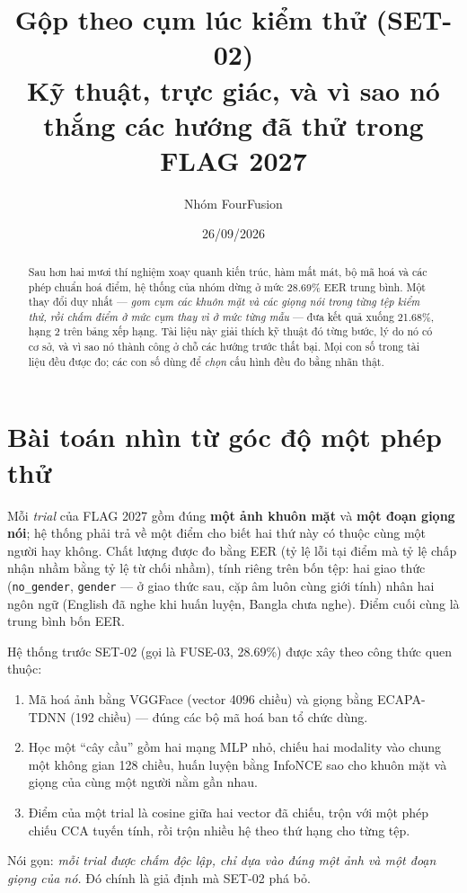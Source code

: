 \documentclass[11pt,a4paper]{article}
\title{\textbf{Gộp theo cụm lúc kiểm thử (SET-02)}\\[4pt]
\large Kỹ thuật, trực giác, và vì sao nó thắng các hướng đã thử trong FLAG 2027}
\author{Nhóm FourFusion}
\date{26/09/2026}
\newcommand{\key}[1]{\textbf{\color{accent}#1}}
\begin{document}
\maketitle

\begin{abstract}
\noindent Sau hơn hai mươi thí nghiệm xoay quanh kiến trúc, hàm mất mát, bộ mã hoá và các phép chuẩn hoá điểm, hệ thống của nhóm dừng ở mức 28.69\% EER trung bình. Một thay đổi duy nhất --- \emph{gom cụm các khuôn mặt và các giọng nói trong từng tệp kiểm thử, rồi chấm điểm ở mức cụm thay vì ở mức từng mẫu} --- đưa kết quả xuống 21.68\%, hạng 2 trên bảng xếp hạng. Tài liệu này giải thích kỹ thuật đó từng bước, lý do nó có cơ sở, và vì sao nó thành công ở chỗ các hướng trước thất bại. Mọi con số trong tài liệu đều được đo; các con số dùng để \emph{chọn} cấu hình đều đo bằng nhãn thật.
\end{abstract}

\section{Bài toán nhìn từ góc độ một phép thử}

Mỗi \emph{trial} của FLAG 2027 gồm đúng \key{một ảnh khuôn mặt} và \key{một đoạn giọng nói}; hệ thống phải trả về một điểm cho biết hai thứ này có thuộc cùng một người hay không. Chất lượng được đo bằng EER (tỷ lệ lỗi tại điểm mà tỷ lệ chấp nhận nhầm bằng tỷ lệ từ chối nhầm), tính riêng trên bốn tệp: hai giao thức (\texttt{no\_gender}, \texttt{gender} --- ở giao thức sau, cặp âm luôn cùng giới tính) nhân hai ngôn ngữ (English đã nghe khi huấn luyện, Bangla chưa nghe). Điểm cuối cùng là trung bình bốn EER.

Hệ thống trước SET-02 (gọi là FUSE-03, 28.69\%) được xây theo công thức quen thuộc:
\begin{enumerate}[leftmargin=1.5em,itemsep=2pt]
\item Mã hoá ảnh bằng VGGFace (vector 4096 chiều) và giọng bằng ECAPA-TDNN (192 chiều) --- đúng các bộ mã hoá ban tổ chức dùng.
\item Học một ``cây cầu'' gồm hai mạng MLP nhỏ, chiếu hai modality vào chung một không gian 128 chiều, huấn luyện bằng InfoNCE sao cho khuôn mặt và giọng của cùng một người nằm gần nhau.
\item Điểm của một trial là cosine giữa hai vector đã chiếu, trộn với một phép chiếu CCA tuyến tính, rồi trộn nhiều hệ theo thứ hạng cho từng tệp.
\end{enumerate}
Nói gọn: \emph{mỗi trial được chấm độc lập, chỉ dựa vào đúng một ảnh và một đoạn giọng của nó.} Đó chính là giả định mà SET-02 phá bỏ.
\end{document}
